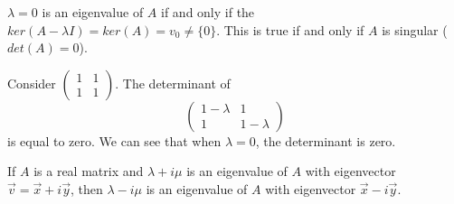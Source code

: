 \begin{note}
  $\lambda=0$ is an eigenvalue of $A$ if and only if the $ker(A-\lambda I)=ker(A)=v_0\neq \{0\}$. This is true if and only if $A$ is singular ($det(A)=0$).
\end{note}
\begin{eg}
  Consider $\begin{pmatrix} 1&1\\1&1 \end{pmatrix} $. The determinant of 
  \[
    \begin{pmatrix} 1-\lambda&1\\1&1-\lambda \end{pmatrix} 
  \] 
  is equal to zero. We can see that when $\lambda =0$, the determinant is zero.
\end{eg}
\begin{prop}
  If $A$ is a real matrix and $\lambda+i\mu$ is an eigenvalue of $A$ with eigenvector $\vec{v}=\vec{x}+i\vec{y}$, then $\lambda-i\mu$ is an eigenvalue of $A$ with eigenvector $\vec{x}-i\vec{y}$.
\end{prop}
